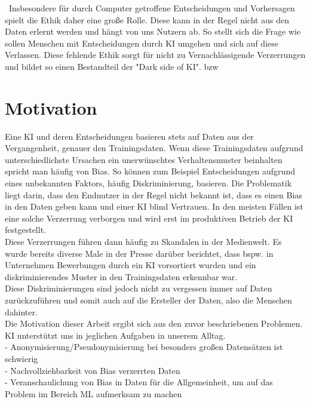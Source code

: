 \begin{onehalfspace}
        \
        Insbesondere für durch Computer getroffene Entscheidungen und Vorhersagen spielt die Ethik daher eine große Rolle. Diese kann in der Regel nicht aus den Daten erlernt werden und hängt von uns Nutzern ab. So stellt sich die Frage wie sollen Menschen mit Entscheidungen durch \ac*{KI} umgehen und sich auf diese Verlassen. Diese fehlende Ethik sorgt für nicht zu Vernachlässigende Verzerrungen und bildet so einen Bestandteil der "Dark side of KI". \ac{bzw}

        \section{Motivation}
        \label{subsec:motivation}
        Eine \ac*{KI} und deren Entscheidungen basieren stets auf Daten aus der Vergangenheit, genauer den Trainingsdaten. Wenn diese Trainingsdaten aufgrund unterschiedlichste Ursachen ein unerwünschtes Verhaltensmuster beinhalten spricht man häufig von Bias. So können zum Beispiel Entscheidungen aufgrund eines unbekannten Faktors, häufig Diskriminierung,  basieren. Die Problematik liegt darin, dass den Endnutzer in der Regel nicht bekannt ist, dass es einen Bias in den Daten geben kann und einer \ac*{KI} blind Vertrauen. In den meisten Fällen ist eine solche Verzerrung verborgen und wird erst im produktiven Betrieb der \ac*{KI} festgestellt. 
        \\
        Diese Verzerrungen führen dann häufig zu Skandalen in der Medienwelt. Es wurde bereits diverse Male in der Presse darüber berichtet, dass bspw. in Unternehmen Bewerbungen durch ein \ac*{KI} vorsortiert wurden und ein diskriminierendes Muster in den Trainingsdaten erkennbar war.
        \\
        Diese Diskriminierungen sind jedoch nicht zu vergessen immer auf Daten zurückzuführen und somit auch auf die Ersteller der Daten, also die Menschen dahinter.
        \\
        Die Motivation dieser Arbeit ergibt sich aus den zuvor beschriebenen Problemen. \ac*{KI} unterstützt uns in jeglichen Aufgaben in unserem Alltag.
        \\
        -	Anonymisierung/Pseudonymisierung bei besonders gro{\ss}en Datensätzen ist schwierig \\
        -	Nachvollziehbarkeit von Bias verzerrten Daten \\
        -	Veranschaulichung von Bias in Daten für die Allgemeinheit, um auf das Problem im Bereich ML aufmerksam zu machen 


\end{onehalfspace}
